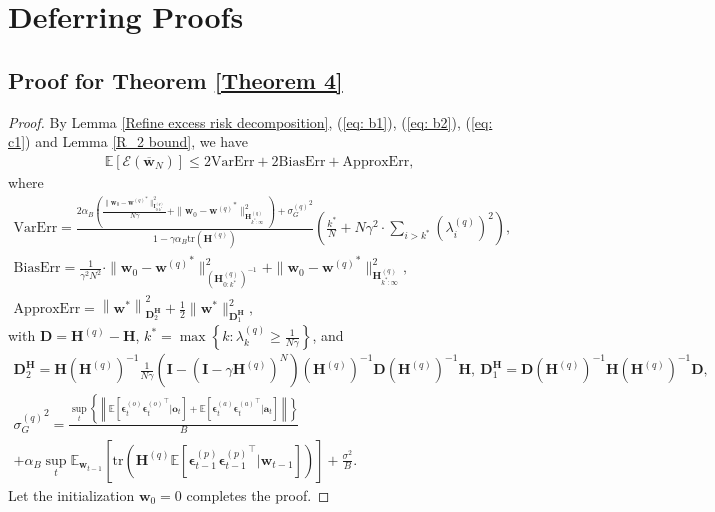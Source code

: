 \documentclass[11pt, letterpaper]{article}
\begin{document}
\section{Deferring Proofs}
\subsection{Proof for Theorem \ref{Theorem 4}}
\label{Proof for Theorem 4.1}
\begin{proof}
    By Lemma \ref{Refine excess risk decomposition}, (\ref{eq: b1}), (\ref{eq: b2}), (\ref{eq: c1}) and Lemma \ref{R_2 bound}, we have
    \begin{equation*}
        \begin{aligned}
            \mathbb{E}[\mathcal{E}(\overline{\mathbf{w}}_N)]\leq 2\mathrm{VarErr}+2\mathrm{BiasErr}+\mathrm{ApproxErr},
        \end{aligned}
    \end{equation*}
    where
    \begin{gather*}
        \mathrm{VarErr}=\frac{2\alpha_B\left(\frac{\|\mathbf{w}_0-{\mathbf{w}^{(q)}}^*\|_{\mathbf{I}_{0:k^*}^{(q)}}^2}{N\gamma}+\|\mathbf{w}_0-{\mathbf{w}^{(q)}}^*\|_{\mathbf{H}_{k^*:\infty}^{(q)}}^2\right)+{\sigma_G^{(q)}}^2}{1-\gamma\alpha_B\mathrm{tr}(\mathbf{H}^{(q)})}\left(\frac{k^*}{N}+N\gamma^2\cdot\sum_{i>k^*}(\lambda_i^{(q)})^2\right),\\
        \mathrm{BiasErr}=\frac{1}{\gamma^2N^2}\cdot\|\mathbf{w}_0-{\mathbf{w}^{(q)}}^*\|_{(\mathbf{H}_{0:k^*}^{(q)})^{-1}}^2+\|\mathbf{w}_0-{\mathbf{w}^{(q)}}^*\|_{\mathbf{H}_{k^*:\infty}^{(q)}}^2,\\
        \mathrm{ApproxErr}=\left\|\mathbf{w}^*\right\|_{\mathbf{D}_2^{\mathbf{H}}}^2
        +\frac{1}{2}\|\mathbf{w}^*\|_{\mathbf{D}_1^{\mathbf{H}}}^2,
    \end{gather*}
    with $\mathbf{D}=\mathbf{H}^{(q)}-\mathbf{H}$, $k^*=\max\left\{k: \lambda_k^{(q)} \geq \frac{1}{N\gamma}\right\}$,  and
    \begin{gather*}
        \mathbf{D}_2^{\mathbf{H}}=\mathbf{H}(\mathbf{H}^{(q)})^{-1}\frac{1}{N\gamma}\left(\mathbf{I}-(\mathbf{I}-\gamma\mathbf{H}^{(q)})^N\right)(\mathbf{H}^{(q)})^{-1}\mathbf{D}(\mathbf{H}^{(q)})^{-1}\mathbf{H},\ \mathbf{D}_1^{\mathbf{H}}=\mathbf{D}(\mathbf{H}^{(q)})^{-1}\mathbf{H}(\mathbf{H}^{(q)})^{-1}\mathbf{D},\\
        {\sigma_G^{(q)}}^2=\frac{\sup_t \left\{\left\|\mathbb{E}\left[\boldsymbol{\epsilon}_t^{(o)}{\boldsymbol{\epsilon}_t^{(o)}}^\top|\mathbf{o}_t\right]+\mathbb{E}\left[\boldsymbol{\epsilon}_t^{(a)}{\boldsymbol{\epsilon}_t^{(a)}}^\top|\mathbf{a}_t\right] \right\|\right\}}{B}\\
        +\alpha_B\sup_t\mathbb{E}_{\mathbf{w}_{t-1}}\left[\mathrm{tr}\left(\mathbf{H}^{(q)} \mathbb{E}\left[\boldsymbol{\epsilon}_{t-1}^{(p)}{\boldsymbol{\epsilon}_{t-1}^{(p)}}^\top \big| \mathbf{w}_{t-1}\right]\right)\right]
        +\frac{\sigma^2}{B}.
    \end{gather*}
    Let the initialization $\mathbf{w}_0=0$ completes the proof.
\end{proof}
\end{document}
